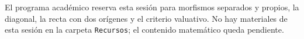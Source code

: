 \begin{nota}
El programa académico reserva esta sesión para morfismos separados y propios, la diagonal, la recta con dos orígenes y el criterio valuativo. No hay materiales de esta sesión en la carpeta \texttt{Recursos}; el contenido matemático queda pendiente.
\end{nota}
